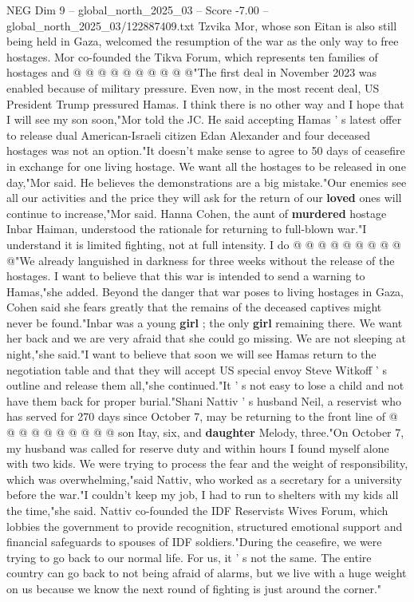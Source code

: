 \begin{textsample}{NEG Dim 9 – global\_north\_2025\_03 – Score -7.00 – global\_north\_2025\_03/122887409.txt}
Tzvika Mor, whose son Eitan is also still being held in Gaza, welcomed the resumption of the war as the only way to free hostages.
Mor co-founded the Tikva Forum, which represents ten families of hostages and @ @ @ @ @ @ @ @ @ @"The first deal in November 2023 was enabled because of military pressure.
Even now, in the most recent deal, US President Trump pressured Hamas.
I think there is no other way and I hope that I will see my son soon,"Mor told the JC.
He said accepting Hamas ' s latest offer to release dual American-Israeli citizen Edan Alexander and four deceased hostages was not an option."It doesn't make sense to agree to 50 days of ceasefire in exchange for one living hostage.
We want all the hostages to be released in one day,"Mor said.
He believes the demonstrations are a big mistake."Our enemies see all our activities and the price they will ask for the return of our \textbf{loved} ones will continue to increase,"Mor said.
Hanna Cohen, the aunt of \textbf{murdered} hostage Inbar Haiman, understood the rationale for returning to full-blown war."I understand it is limited fighting, not at full intensity.
I do @ @ @ @ @ @ @ @ @ @"We already languished in darkness for three weeks without the release of the hostages.
I want to believe that this war is intended to send a warning to Hamas,"she added.
Beyond the danger that war poses to living hostages in Gaza, Cohen said she fears greatly that the remains of the deceased captives might never be found."Inbar was a young \textbf{girl} ; the only \textbf{girl} remaining there.
We want her back and we are very afraid that she could go missing.
We are not sleeping at night,"she said."I want to believe that soon we will see Hamas return to the negotiation table and that they will accept US special envoy Steve Witkoff ' s outline and release them all,"she continued."It ' s not easy to lose a child and not have them back for proper burial."Shani Nattiv ' s husband Neil, a reservist who has served for 270 days since October 7, may be returning to the front line of @ @ @ @ @ @ @ @ @ @ son Itay, six, and \textbf{daughter} Melody, three."On October 7, my husband was called for reserve duty and within hours I found myself alone with two kids.
We were trying to process the fear and the weight of responsibility, which was overwhelming,"said Nattiv, who worked as a secretary for a university before the war."I couldn't keep my job, I had to run to shelters with my kids all the time,"she said.
Nattiv co-founded the IDF Reservists Wives Forum, which lobbies the government to provide recognition, structured emotional support and financial safeguards to spouses of IDF soldiers."During the ceasefire, we were trying to go back to our normal life.
For us, it ' s not the same.
The entire country can go back to not being afraid of alarms, but we live with a huge weight on us because we know the next round of fighting is just around the corner."

\end{textsample}
